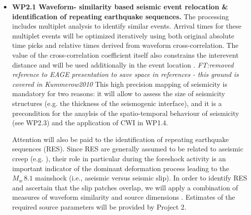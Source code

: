 \documentclass[11pt]{article}
\newcommand{\noteft}[1]{{\it \color{magenta} FT:#1}}
\newcommand{\noteft}[1]{}
\begin{document}
\begin{itemize}
\item
	{\bf WP2.1 Waveform- similarity based seismic event relocation \& identification of repeating earthquake sequences.}
The processing includes multiplet analysis to identify similar events. Arrival times for these multiplet events will be optimized iteratively using both original absolute time picks and relative times derived from waveform cross-correlation. The value of the cross-correlation coefficient itself also constrains the interevent distance and will be used additionally in the event location \citep[e.g.,][]{menke:1999, Kummerow2010,Snieder2005}.\noteft{removed reference to EAGE presentation to save space in references - this ground is covered in Kummerow2010}
This high precision mapping of seismicity is mandatory for two reasons: it will allow to assess the size of seismicity structures (e.g. the thickness of the seismogenic interface), and it is a precondition for the anaylsis of the spatio-temporal behaviour of seismicity (see WP2.3) and the application of CWI in WP1.4.

Attention will also be paid to the identification of repeating earthquake sequences (RES).
Since RES are generally assumed to be related to aseismic creep (e.g. \cite{nadeau:1998}), their role in particular during the foreshock activity is an important indicator of the dominant deformation process leading to the $M_w\,8.1$ mainshock (i.e., aseismic versus seismic slip).
In order to identify RES and ascertain that the slip patches overlap, we will apply a combination of measures of waveform similarity and source dimensions \citep[see][]{kummerow_eage:2014}. Estimates of the required source parameters will be provided by Project 2.


\end{itemize}
\end{document}
